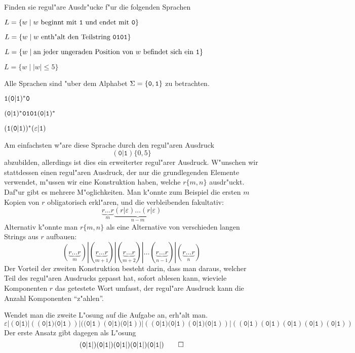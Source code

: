 Finden sie regul"are Ausdr"ucke f"ur die folgenden Sprachen
\begin{teilaufgaben}
\item $L=\{w\;|\;\text{$w$ beginnt mit {\tt 1} und endet mit {\tt 0}}\}$
\item $L=\{w\;|\;\text{$w$ enth"alt den Teilstring {\tt 0101}}\}$
\item $L=\{w\;|\;\text{an jeder ungeraden Position von $w$ befindet sich ein {\tt 1}}\}$
\item $L=\{w\;|\;|w|\le 5\}$
\end{teilaufgaben}
Alle Sprachen sind "uber dem Alphabet $\Sigma=\{{\tt 0},{\tt 1}\}$ zu
betrachten.

\begin{loesung}
\begin{teilaufgaben}
\item ${\tt 1}({\tt 0}|{\tt 1})^*{\tt 0}$
\item $({\tt 0}|{\tt 1})^* {\tt 0101} ({\tt 0}|{\tt 1})^*$
\item $({\tt 1}({\tt 0}|{\tt 1}))^*(\varepsilon|{\tt 1})$
\item
Am einfachsten w"are diese Sprache durch den regul"aren Ausdruck 
\[
(\texttt{0}|\texttt{1})\{0,5\}
\]
abzubilden, allerdings ist dies ein erweiterter regul"arer Ausdruck.
W"unschen wir stattdessen einen regul"aren Ausdruck, der nur die
grundlegenden Elemente verwendet, m"ussen wir eine Konstruktion haben,
welche $r\{m,n\}$ ausdr"uckt. Daf"ur gibt es mehrere M"oglichkeiten.
Man k"onnte zum Beispiel die ersten $m$ Kopien von $r$ obligatorisch
erkl"aren, und die verbleibenden fakultativ:
\[
\underbrace{r\dots r}_m\underbrace{(r|\varepsilon)\dots(r|\varepsilon)}_{n-m}
\]
Alternativ k"onnte man $r\{m,n\}$ als eine Alternative von verschieden langen
Strings aus $r$ aufbauen:
\[
(\underbrace{r\dots r}_m)|
(\underbrace{r\dots r}_{m+1})|
(\underbrace{r\dots r}_{m+2})|\dots
(\underbrace{r\dots r}_{n - 1})|
(\underbrace{r\dots r}_{n})
\]
Der Vorteil der zweiten Konstruktion besteht darin, dass man daraus, welcher
Teil des regul"aren Ausdrucks gepasst hat, sofort ablesen kann, wieviele
Komponenten $r$ das getestete Wort umfasst, der regul"are Ausdruck kann
die Anzahl Komponenten ``z"ahlen''.

Wendet man die zweite L"osung auf die Aufgabe an, erh"alt man.
\[
\varepsilon|
(\texttt{0}|\texttt{1})|
((\texttt{0}|\texttt{1}) (\texttt{0}|\texttt{1}))|
((\texttt{0}|\texttt{1}) (\texttt{0}|\texttt{1}) (\texttt{0}|\texttt{1}))|
((\texttt{0}|\texttt{1}) (\texttt{0}|\texttt{1}) (\texttt{0}|\texttt{1}) (\texttt{0}|\texttt{1}))|
((\texttt{0}|\texttt{1}) (\texttt{0}|\texttt{1}) (\texttt{0}|\texttt{1}) (\texttt{0}|\texttt{1}) (\texttt{0}|\texttt{1}))
\]
Der erste Ansatz gibt dagegen als L"osung
\[
(\texttt{0}|\texttt{1}|)
(\texttt{0}|\texttt{1}|)
(\texttt{0}|\texttt{1}|)
(\texttt{0}|\texttt{1}|)
(\texttt{0}|\texttt{1}|)
\qedhere
\]
\end{teilaufgaben}
\end{loesung}
